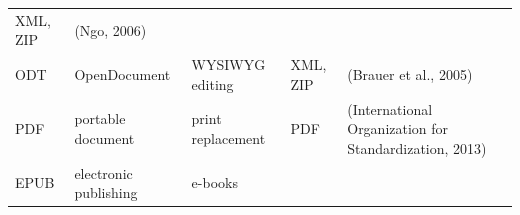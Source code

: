 \documentclass[10pt,fleqn]{wlpeerj}
\begin{document}
\begin{longtable}[c]{@{}lllll@{}}
\begin{minipage}[t]{0.09\columnwidth}
XML, ZIP
\strut\end{minipage} &
\begin{minipage}[t]{0.40\columnwidth}\raggedright\strut
(Ngo, 2006)
\strut\end{minipage}\tabularnewline
\begin{minipage}[t]{0.06\columnwidth}\raggedright\strut
ODT
\strut\end{minipage} &
\begin{minipage}[t]{0.18\columnwidth}\raggedright\strut
OpenDocument
\strut\end{minipage} &
\begin{minipage}[t]{0.13\columnwidth}\raggedright\strut
WYSIWYG editing
\strut\end{minipage} &
\begin{minipage}[t]{0.09\columnwidth}\raggedright\strut
XML, ZIP
\strut\end{minipage} &
\begin{minipage}[t]{0.40\columnwidth}\raggedright\strut
(Brauer et al., 2005)
\strut\end{minipage}\tabularnewline
\begin{minipage}[t]{0.06\columnwidth}\raggedright\strut
PDF
\strut\end{minipage} &
\begin{minipage}[t]{0.18\columnwidth}\raggedright\strut
portable document
\strut\end{minipage} &
\begin{minipage}[t]{0.13\columnwidth}\raggedright\strut
print replacement
\strut\end{minipage} &
\begin{minipage}[t]{0.09\columnwidth}\raggedright\strut
PDF
\strut\end{minipage} &
\begin{minipage}[t]{0.40\columnwidth}\raggedright\strut
(International Organization for Standardization, 2013)
\strut\end{minipage}\tabularnewline
\begin{minipage}[t]{0.06\columnwidth}\raggedright\strut
EPUB
\strut\end{minipage} &
\begin{minipage}[t]{0.18\columnwidth}\raggedright\strut
electronic publishing
\strut\end{minipage} &
\begin{minipage}[t]{0.13\columnwidth}\raggedright\strut
e-books
\strut\end{minipage} &
\begin{minipage}[t]{0.09\columnwidth}\raggedright\strut

\end{minipage}
\end{longtable}
\end{document}
